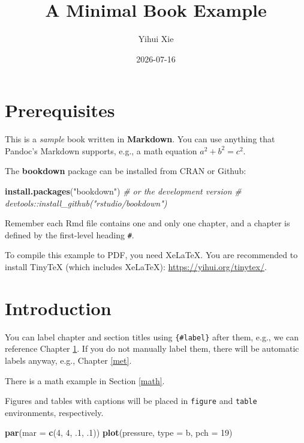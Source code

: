 \documentclass[
]{book}
\title{A Minimal Book Example}
\author{Yihui Xie}
\date{2026-07-16}
\newenvironment{Shaded}{\begin{snugshade}}{\end{snugshade}}
\newcommand{\AttributeTok}[1]{\textcolor[rgb]{0.13,0.29,0.53}{#1}}
\newcommand{\CommentTok}[1]{\textcolor[rgb]{0.56,0.35,0.01}{\textit{#1}}}
\newcommand{\DecValTok}[1]{\textcolor[rgb]{0.00,0.00,0.81}{#1}}
\newcommand{\FunctionTok}[1]{\textcolor[rgb]{0.13,0.29,0.53}{\textbf{#1}}}
\newcommand{\NormalTok}[1]{#1}
\newcommand{\StringTok}[1]{\textcolor[rgb]{0.31,0.60,0.02}{#1}}
\begin{document}
\maketitle

{
\setcounter{tocdepth}{1}
\tableofcontents
}
\hypertarget{prerequisites}{%
\chapter*{Prerequisites}\label{prerequisites}}

This is a \emph{sample} book written in \textbf{Markdown}. You can use anything that Pandoc's Markdown supports, e.g., a math equation \(a^2 + b^2 = c^2\).

The \textbf{bookdown} package can be installed from CRAN or Github:

\begin{Shaded}
\begin{Highlighting}[]
\FunctionTok{install.packages}\NormalTok{(}\StringTok{"bookdown"}\NormalTok{)}
\CommentTok{\# or the development version}
\CommentTok{\# devtools::install\_github("rstudio/bookdown")}
\end{Highlighting}
\end{Shaded}

Remember each Rmd file contains one and only one chapter, and a chapter is defined by the first-level heading \texttt{\#}.

To compile this example to PDF, you need XeLaTeX. You are recommended to install TinyTeX (which includes XeLaTeX): \url{https://yihui.org/tinytex/}.

\hypertarget{intro}{%
\chapter{Introduction}\label{intro}}

You can label chapter and section titles using \texttt{\{\#label\}} after them, e.g., we can reference Chapter \ref{intro}. If you do not manually label them, there will be automatic labels anyway, e.g., Chapter \ref{met}.

There is a math example in Section \ref{math}.

Figures and tables with captions will be placed in \texttt{figure} and \texttt{table} environments, respectively.

\begin{Shaded}
\begin{Highlighting}[]
\FunctionTok{par}\NormalTok{(}\AttributeTok{mar =} \FunctionTok{c}\NormalTok{(}\DecValTok{4}\NormalTok{, }\DecValTok{4}\NormalTok{, .}\DecValTok{1}\NormalTok{, .}\DecValTok{1}\NormalTok{))}
\FunctionTok{plot}\NormalTok{(pressure, }\AttributeTok{type =} \StringTok{\textquotesingle{}b\textquotesingle{}}\NormalTok{, }\AttributeTok{pch =} \DecValTok{19}\NormalTok{)}
\end{Highlighting}
\end{Shaded}
\end{document}
